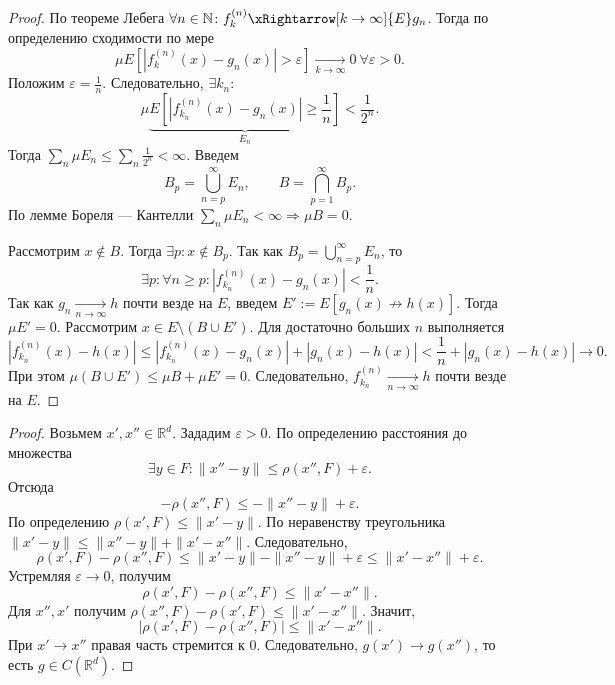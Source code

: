 \documentclass[12pt,a4paper]{report}
\begin{document}
\begin{proof}
    По теореме Лебега $\forall n\in\mathbb N\colon f_k^{(n)}\xRightarrow[k\to\infty]{E}g_n$. Тогда по определению сходимости по мере
    \[
    \mu E[|f_k^{(n)}(x)-g_n(x)|>\varepsilon]\underset{k\to\infty}{\to}0 \ \forall\varepsilon>0.
    \]
    Положим $\varepsilon=\frac{1}{n}$. Следовательно, $\exists k_n\colon$
    \[
    \mu\underbrace{E\left[\left|f_{k_n}^{(n)}(x)-g_n(x)\right|\geq\frac{1}{n}\right]}_{E_n}<\frac{1}{2^n}.
    \]
    Тогда $\sum_n\mu E_n\leq\sum_n\frac{1}{2^n}<\infty$. Введем
    \[
    B_p=\bigcup_{n=p}^{\infty}E_n, \qquad B=\bigcap_{p=1}^{\infty}B_p.
    \]
    По лемме Бореля --- Кантелли $\sum_n\mu E_n<\infty\Rightarrow\mu B=0$.

    Рассмотрим $x\notin B$. Тогда $\exists p\colon x\notin B_p$. Так как $B_p=\bigcup_{n=p}^{\infty}E_n$, то
    \[
    \exists p\colon \forall n\geq p\colon \left|f_{k_n}^{(n)}(x)-g_n(x)\right|<\frac{1}{n}.
    \]
    Так как $g_n\underset{n\to\infty}{\to}h$ почти везде на $E$, введем $E':=E[g_n(x)\not\to h(x)]$. Тогда $\mu E'=0$. Рассмотрим $x\in E\setminus(B\cup E')$. Для достаточно больших $n$ выполняется
    \[
    |f_{k_n}^{(n)}(x)-h(x)|
    \leq |f_{k_n}^{(n)}(x)-g_n(x)|+|g_n(x)-h(x)|
    <\frac{1}{n}+|g_n(x)-h(x)|\to0.
    \]
    При этом $\mu(B\cup E')\leq\mu B+\mu E'=0$. Следовательно, $f_{k_n}^{(n)}\underset{n\to\infty}{\to}h$ почти везде на $E$.
\end{proof}



\begin{proof}
    Возьмем $x',x''\in\mathbb R^d$. Зададим $\varepsilon>0$. По определению расстояния до множества
    \[
    \exists y\in F\colon \|x''-y\|\leq\rho(x'',F)+\varepsilon.
    \]
    Отсюда
    \[
    -\rho(x'',F)\leq-\|x''-y\|+\varepsilon.
    \]
    По определению $\rho(x',F)\leq\|x'-y\|$. По неравенству треугольника $\|x'-y\|\leq\|x''-y\|+\|x'-x''\|$. Следовательно,
    \[
    \rho(x',F)-\rho(x'',F)
    \leq\|x'-y\|-\|x''-y\|+\varepsilon
    \leq\|x'-x''\|+\varepsilon.
    \]
    Устремляя $\varepsilon\to0$, получим
    \[
    \rho(x',F)-\rho(x'',F)\leq\|x'-x''\|.
    \]
    Для $x'',x'$ получим $\rho(x'',F)-\rho(x',F)\leq\|x'-x''\|$. Значит,
    \[
    |\rho(x',F)-\rho(x'',F)|\leq\|x'-x''\|.
    \]
    При $x'\to x''$ правая часть стремится к $0$. Следовательно, $g(x')\to g(x'')$, то есть $g\in C(\mathbb R^d)$.
\end{proof}
\end{document}
